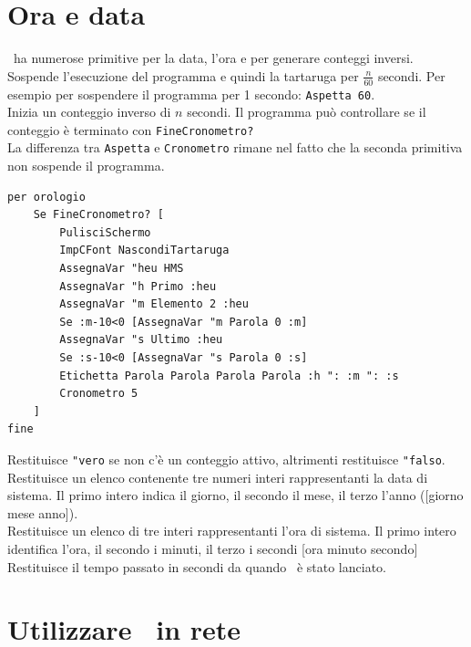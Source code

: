 \section{Ora e data}
\xlogo\ ha numerose primitive per la data, l'ora e per generare conteggi inversi.\\

 Sospende l'esecuzione del programma e quindi la tartaruga per $\frac{n}{60}$ secondi. Per esempio per sospendere il programma per 1 secondo: \texttt{Aspetta 60}.  \\

Inizia un conteggio inverso di $n$ secondi. Il programma può controllare se il conteggio è terminato con  \texttt{FineCronometro?}\\

La differenza tra \texttt{Aspetta} e \texttt{Cronometro} rimane nel fatto che la seconda primitiva non sospende il programma.\\

\begin{lstlisting}[caption="Uso della primitiva \texttt{cronometro}"]
per orologio
	Se FineCronometro? [
		PulisciSchermo 
		ImpCFont NascondiTartaruga
		AssegnaVar "heu HMS
		AssegnaVar "h Primo :heu
		AssegnaVar "m Elemento 2 :heu
		Se :m-10<0 [AssegnaVar "m Parola 0 :m]
		AssegnaVar "s Ultimo :heu
		Se :s-10<0 [AssegnaVar "s Parola 0 :s]
		Etichetta Parola Parola Parola Parola :h ": :m ": :s 
		Cronometro 5
	]
fine
\end{lstlisting} 


Restituisce \texttt{"vero} se non c'è un conteggio attivo, altrimenti restituisce \texttt{"falso}.\\

Restituisce un elenco contenente tre numeri interi rappresentanti la data di sistema. Il primo intero indica il giorno, il secondo il mese, il terzo l'anno ([giorno mese anno]).\\

Restituisce un elenco di tre interi rappresentanti l'ora di sistema. Il primo intero identifica l'ora, il secondo i minuti, il terzo i secondi [ora minuto secondo]\\

Restituisce il tempo passato in secondi da quando \xlogo\ è stato lanciato.\\



\section{Utilizzare \xlogo\ in rete}
\label{network}

